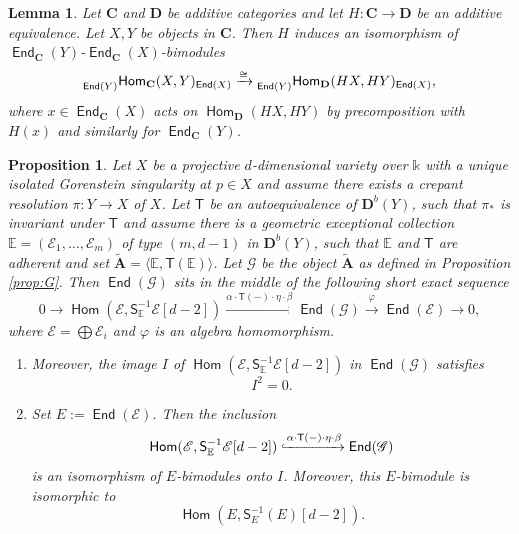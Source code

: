 \documentclass[a4paper,11pt, reqno]{amsart}
\def\E{\mathbb E}
\def\AA{\mathbf A}
\def\CC{\mathbf C}
\def\DD{\mathbf D}
\def\sE{\mathscr{E}}
\def\sG{\mathscr{G}}
\newcommand{\opname}[1]{\operatorname{\mathsf{#1}}}
\newcommand{\Hom}{\opname{Hom}}
\newcommand{\End}{\opname{End}}
\def\Db{\DD^b}
\newcommand{\bS}{\mathsf{S}}
\newcommand{\bT}{\mathsf{T}}
\theoremstyle{plain}
\newtheorem{prop}[dummy]{Proposition}
\newtheorem{lemma}[dummy]{Lemma}
\theoremstyle{definition}
\numberwithin{equation}{section}
\newlength{\arrow}
\begin{document}
\begin{lemma}\label{lem:equiv-bimod}
    Let $\CC$ and $\DD$ be additive categories and let $H\colon \CC \to\DD$ be an additive equivalence. Let $X, Y$ be objects in $\CC$. Then $H$ induces an isomorphism of $\End_\CC(Y)$-$\End_\CC(X)$-bimodules
    \begin{align*}
        \prescript{}{\End ( Y )}{\Hom_\CC(X, Y)}_{\End(X)} \xrightarrow{\cong} \prescript{}{\End ( Y )}{\Hom_\DD(HX, HY)}_{\End(X)} ,
    \end{align*}
    where $x \in \End_\CC(X)$ acts on $\Hom_\DD(HX, HY)$ by precomposition with $H(x)$ and similarly for $\End_\CC(Y)$. 
\end{lemma}





\begin{prop}\label{prop:algebra-extensions}
    Let $X$ be a projective $d$-dimensional variety over $\mathbb{k}$ with a unique isolated Gorenstein singularity at $p \in X$ and assume there exists a crepant resolution $\pi \colon Y \to X$ of $X$.
Let $\bT$ be an autoequivalence of $\Db(Y)$, such that $\pi_\ast$ is invariant under $\bT $ and assume there is a geometric exceptional collection $\E = (  \sE_1 , \ldots , \sE_m )$ of type $(m, d-1)$ in $\Db(Y)$, such that $\E$ and $\bT$ are adherent and set $\tilde{\AA} = \langle \E , \bT ( \E ) \rangle$.
Let $\sG $ be the object $\tilde{\AA}$ as defined in Proposition \ref{prop:G}.
Then $\End ( \sG )$ sits in the middle of the following short exact sequence
\begin{equation}\label{eq:ses-G}
    0 \to  \Hom(\sE, \bS^{-1}_\E\sE [d-2] ) \xrightarrow{\alpha \cdot \bT(-) \cdot \eta \cdot \beta} \End( \sG ) \xrightarrow{\varphi} \End( \sE ) \to 0 ,
\end{equation}
where $\sE = \bigoplus \sE_i$ and $\varphi$ is an algebra homomorphism.
\begin{enumerate}
\item\label{prop:algebra-extensions-3} Moreover, the image $I$ of $\Hom(\sE, \bS^{-1}_\E \sE [d-2])$ in $\End( \sG )$ satisfies 
\begin{equation}
    I^2=0 .
\end{equation}
\item\label{prop:algebra-extensions-2} 
Set $E:=\End ( \sE )$. Then the inclusion
\[
\Hom(\sE, \bS^{-1}_\E\sE [d-2] ) \xhookrightarrow{\alpha \cdot \bT(-) \cdot \eta \cdot \beta} \End( \sG )
\]
is an isomorphism of $E$-bimodules onto $I$.
Moreover,
this $E$-bimodule is isomorphic to  
\[
\Hom(E, \bS_E^{-1}(E)[d-2]) .
\]
\end{enumerate}
\end{prop}
\end{document}
